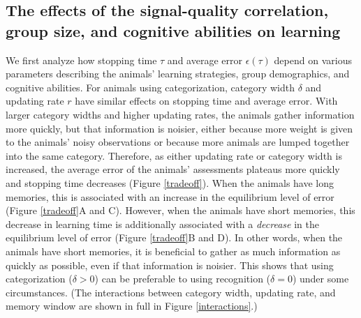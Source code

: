 \subsection*{The effects of the signal-quality correlation, group size, and cognitive abilities on learning}
We first analyze how stopping time $\tau$  and average error $\epsilon(\tau)$ depend on various parameters describing the animals' learning strategies, group demographics, and cognitive abilities.  For animals using categorization, category width $\delta$ and updating rate $r$ have similar effects on stopping time and average error. With larger category widths and higher updating rates, the animals gather information more quickly, but that information is noisier, either because more weight is given to the animals' noisy observations or because more animals are lumped together into the same category. Therefore, as either updating rate or category width is increased, the average error of the animals' assessments plateaus more quickly and stopping time decreases (Figure \ref{tradeoff}). When the animals have long memories, this is associated with an increase in the equilibrium level of error (Figure \ref{tradeoff}A and C). However, when the animals have short memories, this decrease in learning time is additionally associated with a \emph{decrease} in the equilibrium level of error (Figure \ref{tradeoff}B and D). In other words, when the animals have short memories, it is beneficial to gather as much information as quickly as possible, even if that information is noisier. This shows that using categorization ($\delta>0$) can be preferable to using recognition ($\delta=0$) under some circumstances. (The interactions between category width, updating rate, and memory window are shown in full in Figure \ref{interactions}.)

